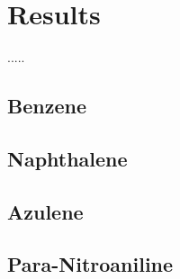 \chapter[Results]%
{Results}
\label{ch:five}
%
 {.....}
\section{Benzene}
\section{Naphthalene}
\section{Azulene}
\section{Para-Nitroaniline}
%

